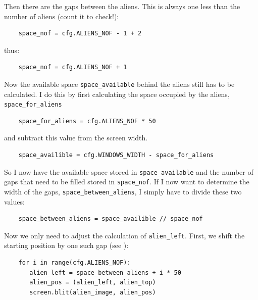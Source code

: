 Then there are the gaps between the aliens. This is always one less than the number of aliens (count it to check!):

\lstset{firstnumber=25}
\begin{lstlisting}
	space_nof = cfg.ALIENS_NOF - 1 + 2
\end{lstlisting}

thus:

\lstset{firstnumber=25}
\begin{lstlisting}
	space_nof = cfg.ALIENS_NOF + 1     
\end{lstlisting}

Now the available space \texttt{space\_available} behind the aliens still has to be calculated.
I do this by first calculating the space occupied by the aliens, \texttt{space\_\-for\_\-aliens}

\lstset{firstnumber=28}
\begin{lstlisting}
	space_for_aliens = cfg.ALIENS_NOF * 50     
\end{lstlisting}

and subtract this value from the screen width.

\lstset{firstnumber=24}
\begin{lstlisting}
	space_availible = cfg.WINDOWS_WIDTH - space_for_aliens
\end{lstlisting}

So I now have the available space stored in \texttt{space\_available} and the number of gaps that need to be filled stored in \texttt{space\_nof}. If I now want to determine the width of the gaps,
\texttt{space\_between\_\-aliens}, I simply have to divide these two values:

\lstset{firstnumber=26}
\begin{lstlisting}
	space_between_aliens = space_availible // space_nof
\end{lstlisting}

Now we only need to adjust the calculation of \texttt{alien\_left}. First, we shift the starting position by one such gap (see ):

\lstset{firstnumber=36}
\begin{lstlisting}
	for i in range(cfg.ALIENS_NOF):
	   alien_left = space_between_aliens + i * 50
	   alien_pos = (alien_left, alien_top)
	   screen.blit(alien_image, alien_pos)
\end{lstlisting}


